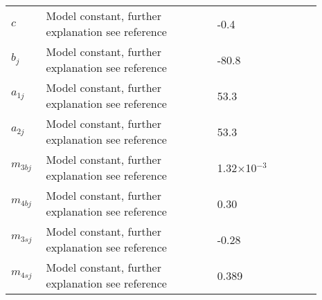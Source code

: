 \documentclass[fleqn]{report}
\numberwithin{equation}{section}
\numberwithin{equation}{section}
\begin{document}
							\begin{table}[h!]
							\centering
							\begin{tabular}{ p{0.09\linewidth}  >{\footnotesize} p{0.5\linewidth}  >{\footnotesize} p{0.27\linewidth} >{\footnotesize} p{0.03\linewidth} }
							\hline
							$c$      				& Model constant, further explanation see reference					& -0.4 \uM			& \cite{Koenigsberger2006} \\
							$b_{j}$      			& Model constant, further explanation see reference					& -80.8 \mV		& \cite{Koenigsberger2006} \\
							$a_{1j}$      			& Model constant, further explanation see reference					& 53.3 \uMkeermV	& \cite{Koenigsberger2006} \\
							$a_{2j}$      			& Model constant, further explanation see reference					& 53.3 \mVpuM		& \cite{Koenigsberger2006} \\
							$m_{3bj}$      			& Model constant, further explanation see reference					& 1.32$\times$10$^{-3}$ \uMpmV	& \cite{Koenigsberger2006} \\
							$m_{4bj}$      			& Model constant, further explanation see reference					& 0.30	\uMkeermV	& \cite{Koenigsberger2006} \\
							$m_{3sj}$      			& Model constant, further explanation see reference					& -0.28 \uM		& \cite{Koenigsberger2006} \\
							$m_{4sj}$      			& Model constant, further explanation see reference					& 0.389 \uM		& \cite{Koenigsberger2006} \\
							\hline
							\end{tabular}
							\label{tab:JBKCAj}
							\end{table}
							\\
\end{document}
